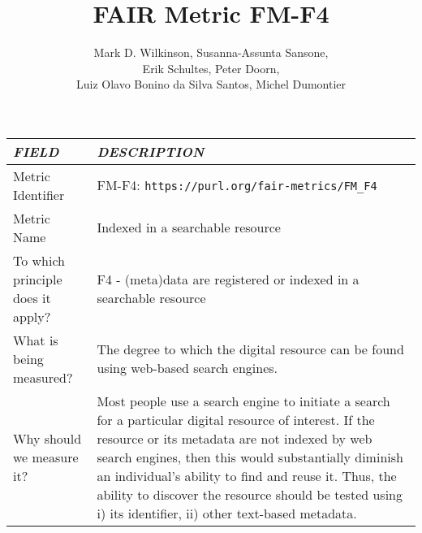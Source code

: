 \documentclass[english]{article}
\begin{document}
\title{FAIR Metric FM-F4}

\author{Mark D. Wilkinson, Susanna-Assunta Sansone, \\Erik Schultes, Peter Doorn,\\ 
Luiz Olavo Bonino da Silva Santos, Michel Dumontier}

\maketitle

\newpage





\begin{longtable}{|p{5cm}|p{9cm}|}


\hline
\emph{FIELD} & \emph{DESCRIPTION} \\
\hline
Metric Identifier &   FM-F4: \verb"https://purl.org/fair-metrics/FM_F4"
 \\


\hline
Metric Name &   


Indexed in a searchable resource



 \\



\hline
To which principle does it apply? &   

F4 - (meta)data are registered or indexed in a searchable resource

\\



\hline
What is being measured? & 



The degree to which the digital resource can be found using  web-based search engines.


\\



\hline
Why should we measure it? & 




Most people use a search engine to initiate a search for a particular digital resource of interest. If the resource or its metadata are not indexed by web search engines, then this would substantially diminish an individual’s ability to find and reuse it. Thus, the ability to discover the resource should be tested using i) its identifier, ii) other text-based metadata. 



\end{longtable}
\end{document}
